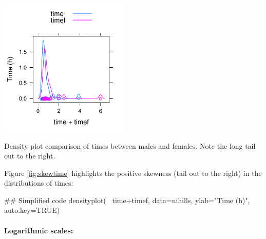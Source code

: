 \documentclass{tufte-book}\usepackage[]{graphicx}\usepackage[]{color}
\begin{document}
\begin{marginfigure}
\begin{Schunk}


\centerline{\includegraphics[width=0.47\textwidth]{figs/11-mfdensity-1} }

\end{Schunk}
  \caption{Density plot comparison of times between males
    and females.  Note the long tail out to the right.}\label{fig:skewtime}
\end{marginfigure}

Figure \ref{fig:skewtime} highlights the positive skewness (tail out
to the right) in the distributions of times:
\begin{Schunk}
\begin{Sinput}
## Simplified code
densityplot(~ time+timef, data=nihills,
            ylab="Time (h)", auto.key=TRUE)
\end{Sinput}
\end{Schunk}

\paragraph{Logarithmic scales:}
\end{document}
